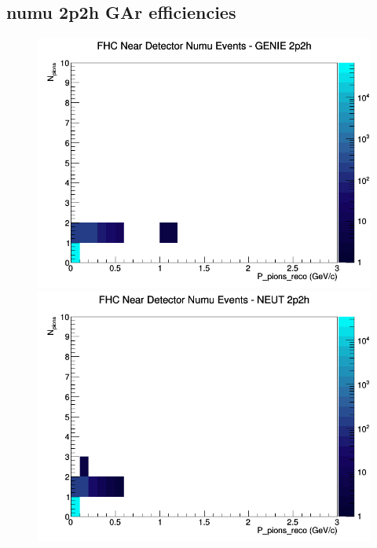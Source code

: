 \documentclass[12pt]{article}
\begin{document}
\subsection{numu 2p2h GAr efficiencies}
\begin{figure}[h]
\includegraphics[width=\linewidth]{eff_N_P/GAr/pions/2p2h_FHC_ND_numu_N_P_GENIE.png}
\endminipage
{}
\includegraphics[width=\linewidth]{eff_N_P/GAr/pions/2p2h_FHC_ND_numu_N_P_NEUT.png}
\endminipage
{}

\end{figure}
\end{document}
